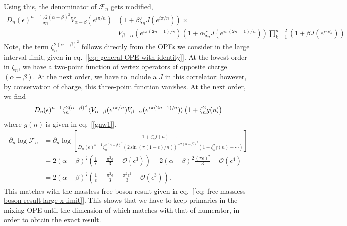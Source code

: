 \documentclass[11pt]{article}
\newcommand{\ep}{\epsilon}
\newcommand{\p}{\partial}
\newcommand{\mO}{\mathcal{O}}
\newcommand{\nn}{\nonumber}
\newcommand{\lb}{\left(}
\newcommand{\rb}{\right)}
\begin{document}
Using this, the denominator of $\mathcal{F}_n$ gets modified, 
\begin{align}
    D_n(\ep)^{n-1}\zeta_n^{2(\alpha-\beta)^2}V_{\alpha- \beta}(e^{i\pi/n}) &(1 + \beta \zeta_n J(e^{i\pi /n}))\times \\
    &V_{\beta - \alpha} (e^{i\pi (2n-1)/n })(1 +\alpha \zeta_n J(e^{i\pi (2n-1)/n}))\prod_{k=1}^{n-2} (1 + \beta J(e^{i \pi \theta_k}))
\end{align}
Note, the term $\zeta_n^{2(\alpha - \beta)^2}$ follows directly from the OPEs we consider in the large interval limit, given in eq.~[\ref{eq: general OPE with identity}]. 
At the lowest order in $\zeta_n$, we have a two-point function of vertex operators of opposite charge $(\alpha-\beta)$. At the next order, we have to include a $J$ in this correlator; however, by conservation of charge, this three-point function vanishes. At the next order, we find  
\begin{align}
    D_n(\ep)^{n-1}
    \zeta_n^{2(\alpha-\beta)^2} \braket{V_{\alpha- \beta}(e^{i\pi/n})V_{\beta - \alpha} (e^{i\pi (2n-1)/n })} \lb 1 + \zeta_n^{2}g(n)\rb
\end{align}
where $g(n)$ is given in eq.~[\ref{gnw1}]. 
\begin{align}\label{eq: coherent states rel entr}
    \p_n \log \mathcal{F}_n &= \p_n \log \left[\frac{1+\zeta_n^{2} f(n)+\cdots}{D_n(\ep)^{n-1}\zeta_n^{2(\alpha-\beta)^2} (2\sin(\pi (1-\ep)/n))^{-2(\alpha-\beta)^2}\lb 1+ \zeta_n^2 g(n) +\cdots\rb}\right] \nn \\
    &= 2(\alpha - \beta)^2 \lb \frac{1}{\ep} - \frac{\pi^2 \ep}{3}+\mO(\ep^3)\rb + 2(\alpha- \beta)^2\frac{\lb \pi \ep \rb^2}{3} + \mO(\ep^4)\cdots\nn \\
    &= 2(\alpha - \beta)^2 \lb \frac{1}{\ep} - \frac{\pi^2\ep}{3}+ \frac{\pi^2\ep^2}{3}+ \mO(\ep^3)\rb .
\end{align}
This matches with the massless free boson result given in eq.~[\ref{eq: free massless boson result large x limit}]. This shows that we have to keep primaries in the mixing OPE until the dimension of which matches with that of numerator, in order to obtain the exact result. 
\end{document}
